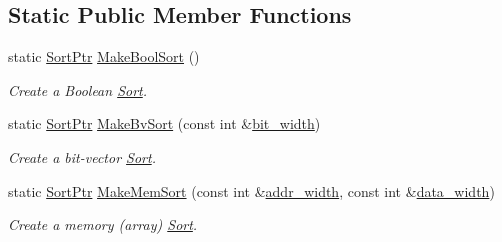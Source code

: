 \subsection*{Static Public Member Functions}
\begin{DoxyCompactItemize}
\item 
\mbox{\label{classilang_1_1_sort_ad051b4711582cf543e6ed268dd24907c}} 
static \mbox{\hyperlink{classilang_1_1_sort_a8b9cc5e381404211a1c0423327866d3b}{Sort\+Ptr}} \mbox{\hyperlink{classilang_1_1_sort_ad051b4711582cf543e6ed268dd24907c}{Make\+Bool\+Sort}} ()
\begin{DoxyCompactList}\small\item\em Create a Boolean \mbox{\hyperlink{classilang_1_1_sort}{Sort}}. \end{DoxyCompactList}\item 
\mbox{\label{classilang_1_1_sort_a988f21e434cafda438e791276dada110}} 
static \mbox{\hyperlink{classilang_1_1_sort_a8b9cc5e381404211a1c0423327866d3b}{Sort\+Ptr}} \mbox{\hyperlink{classilang_1_1_sort_a988f21e434cafda438e791276dada110}{Make\+Bv\+Sort}} (const int \&\mbox{\hyperlink{classilang_1_1_sort_a8bfc1d2049279a2ad2be608e14731d1d}{bit\+\_\+width}})
\begin{DoxyCompactList}\small\item\em Create a bit-\/vector \mbox{\hyperlink{classilang_1_1_sort}{Sort}}. \end{DoxyCompactList}\item 
\mbox{\label{classilang_1_1_sort_a0a292d2658d5c44190dc94a81ef62b73}} 
static \mbox{\hyperlink{classilang_1_1_sort_a8b9cc5e381404211a1c0423327866d3b}{Sort\+Ptr}} \mbox{\hyperlink{classilang_1_1_sort_a0a292d2658d5c44190dc94a81ef62b73}{Make\+Mem\+Sort}} (const int \&\mbox{\hyperlink{classilang_1_1_sort_a6f3a690a09c3f4aad3ff63daeede0715}{addr\+\_\+width}}, const int \&\mbox{\hyperlink{classilang_1_1_sort_a4c5f5d8cb6b9b16f68236b515e2f2567}{data\+\_\+width}})
\begin{DoxyCompactList}\small\item\em Create a memory (array) \mbox{\hyperlink{classilang_1_1_sort}{Sort}}. \end{DoxyCompactList}\end{DoxyCompactItemize}
